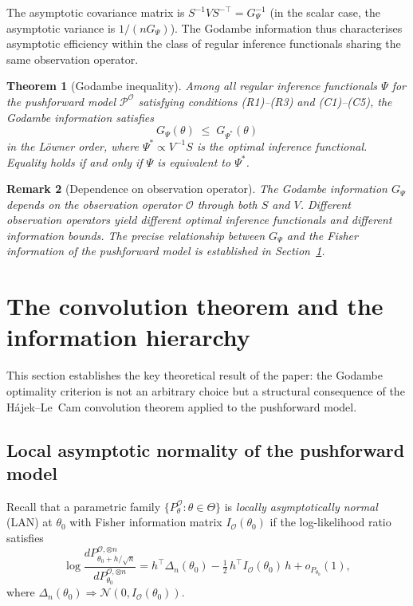 \documentclass[11pt,a4paper]{article}
\newtheorem{theorem}{Theorem}[section]
\newtheorem{remark}[theorem]{Remark}
\begin{document}
The asymptotic covariance matrix is
$S^{-1}VS^{-\top} = G_\Psi^{-1}$ (in the scalar case, the asymptotic
variance is $1/(nG_\Psi)$).  The Godambe information thus characterises
asymptotic efficiency within the class of regular inference functionals
sharing the same observation operator.

\begin{theorem}[Godambe inequality]\label{thm:godambe-ineq}
Among all regular inference functionals $\Psi$ for the pushforward model
$\mathcal P^{\mathcal O}$ satisfying conditions (R1)--(R3) and
(C1)--(C5), the Godambe information satisfies
\[
G_\Psi(\theta)
\;\leq\;
G_{\Psi^*}(\theta)
\]
in the L\"owner order, where $\Psi^* \propto V^{-1}S$ is the optimal
inference functional.  Equality holds if and only if $\Psi$ is
equivalent to $\Psi^*$.
\end{theorem}

\begin{remark}[Dependence on observation operator]\label{rem:G-depends-O}
The Godambe information $G_\Psi$ depends on the observation operator
$\mathcal O$ through both $S$ and $V$.  Different observation operators
yield different optimal inference functionals and different information
bounds.  The precise relationship between $G_\Psi$ and the Fisher
information of the pushforward model is established in
Section~\ref{sec:convolution}.
\end{remark}


\section{The convolution theorem and the information hierarchy}\label{sec:convolution}

This section establishes the key theoretical result of the paper: the
Godambe optimality criterion is not an arbitrary choice but a structural
consequence of the H\'ajek--Le~Cam convolution theorem applied to the
pushforward model.

\subsection{Local asymptotic normality of the pushforward model}\label{subsec:LAN}

Recall that a parametric family $\{P_\theta^{\mathcal O} : \theta \in \Theta\}$ is \emph{locally asymptotically normal} (LAN) at $\theta_0$ with Fisher information matrix $I_{\mathcal O}(\theta_0)$ if the log-likelihood ratio satisfies
\begin{equation}\label{eq:LAN}
\log \frac{dP_{\theta_0 + h/\sqrt{n}}^{\mathcal O,\otimes n}}
         {dP_{\theta_0}^{\mathcal O,\otimes n}}
= h^\top \Delta_n(\theta_0)
  - \tfrac{1}{2}\, h^\top I_{\mathcal O}(\theta_0)\, h
  + o_{P_{\theta_0}}(1),
\end{equation}
where $\Delta_n(\theta_0) \Rightarrow \mathcal N(0, I_{\mathcal O}(\theta_0))$.
\end{document}
